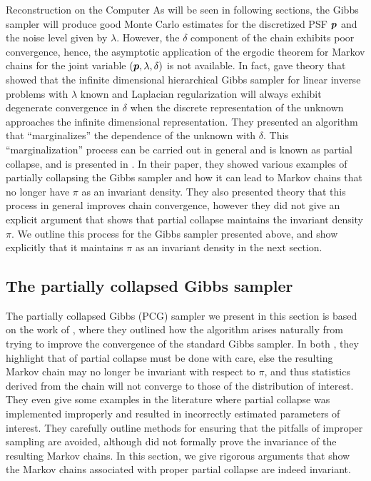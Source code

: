 \begin{chapter}{Reconstruction on the Computer}
As will be seen in following sections, the Gibbs sampler will produce good Monte Carlo estimates for the discretized PSF $\mbox{\boldmath$p$}$ and the noise level given by $\lambda$. 
However, the $\delta$ component of the chain exhibits poor convergence, hence, the asymptotic application of the ergodic theorem for Markov chains for the joint variable $(\mbox{\boldmath$p$},\lambda,\delta)$ is not available.
In fact, \citep{agapiou2014analysis} gave theory that showed that the infinite dimensional hierarchical Gibbs sampler for linear inverse problems with $\lambda$ known and Laplacian regularization will always exhibit degenerate convergence in $\delta$ when the discrete representation of the unknown approaches the infinite dimensional representation.
They presented an algorithm that ``marginalizes'' the dependence of the unknown with $\delta$.
This ``marginalization'' process can be carried out in general and is known as partial collapse, and is presented in \citep{van2008partially}.
In their paper, they showed various examples of partially collapsing the Gibbs sampler and how it can lead to Markov chains that no longer have $\pi$ as an invariant density.
They also presented theory that this process in general improves chain convergence, however they did not give an explicit argument that shows that partial collapse maintains the invariant density $\pi$.
We outline this process for the Gibbs sampler presented above, and show explicitly that it maintains $\pi$ as an invariant density in the next section.

\subsection{The partially collapsed Gibbs sampler}
The partially collapsed Gibbs (PCG) sampler we present in this section is based on the work of \citep{van2008partially,van2015metropolis}, where they outlined how the algorithm arises naturally from trying to improve the convergence of the standard Gibbs sampler.
In both \citep{van2008partially,van2015metropolis}, they highlight that of partial collapse must be done with care, else the resulting Markov chain may no longer be invariant with respect to $\pi$, and thus statistics derived from the chain will not converge to those of the distribution of interest.
They even give some examples in the literature where partial collapse was implemented improperly and resulted in incorrectly estimated parameters of interest.
They carefully outline methods for ensuring that the pitfalls of improper sampling are avoided, although did not formally prove the invariance of the resulting Markov chains.
In this section, we give rigorous arguments that show the Markov chains associated with proper partial collapse are indeed invariant.


\end{chapter}
